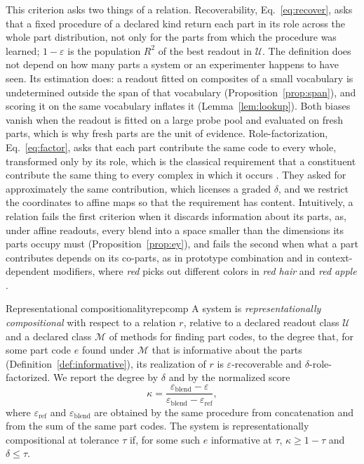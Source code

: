 \documentclass[10pt]{article}
\theoremstyle{plain}
\theoremstyle{remark}
\newcommand{\U}{\mathcal{U}}
\newcommand{\M}{\mathcal{M}}
\begin{document}
This criterion asks two things of a relation. Recoverability, Eq.~\eqref{eq:recover}, asks that a fixed procedure of a declared kind return each part in its role across the whole part distribution, not only for the parts from which the procedure was learned; $1 - \varepsilon$ is the population $R^2$ of the best readout in $\U$. The definition does not depend on how many parts a system or an experimenter happens to have seen. Its estimation does: a readout fitted on composites of a small vocabulary is undetermined outside the span of that vocabulary (Proposition~\ref{prop:span}), and scoring it on the same vocabulary inflates it (Lemma~\ref{lem:lookup}). Both biases vanish when the readout is fitted on a large probe pool and evaluated on fresh parts, which is why fresh parts are the unit of evidence. Role-factorization, Eq.~\eqref{eq:factor}, asks that each part contribute the same code to every whole, transformed only by its role, which is the classical requirement that a constituent contribute the same thing to every complex in which it occurs \citep{fodor1988}. They asked for approximately the same contribution, which licenses a graded $\delta$, and we restrict the coordinates to affine maps so that the requirement has content. Intuitively, a relation fails the first criterion when it discards information about its parts, as, under affine readouts, every blend into a space smaller than the dimensions its parts occupy must (Proposition~\ref{prop:ey}), and fails the second when what a part contributes depends on its co-parts, as in prototype combination \citep{smith1988,hampton1987} and in context-dependent modifiers, where \emph{red} picks out different colors in \emph{red hair} and \emph{red apple} \citep{kamp1995}.

\begin{defbox}{Representational compositionality}{repcomp}
A system is \emph{representationally compositional} with respect to a relation $r$, relative to a declared readout class $\U$ and a declared class $\M$ of methods for finding part codes, to the degree that, for some part code $e$ found under $\M$ that is informative about the parts (Definition~\ref{def:informative}), its realization of $r$ is $\varepsilon$-recoverable and $\delta$-role-factorized. We report the degree by $\delta$ and by the normalized score
\begin{equation}
  \kappa = \frac{\varepsilon_{\mathrm{blend}} - \varepsilon}{\varepsilon_{\mathrm{blend}} - \varepsilon_{\mathrm{ref}}},
  \label{eq:kappa}
\end{equation}
where $\varepsilon_{\mathrm{ref}}$ and $\varepsilon_{\mathrm{blend}}$ are obtained by the same procedure from concatenation and from the sum of the same part codes. The system is representationally compositional at tolerance $\tau$ if, for some such $e$ informative at $\tau$, $\kappa \ge 1 - \tau$ and $\delta \le \tau$.
\end{defbox}
\end{document}
